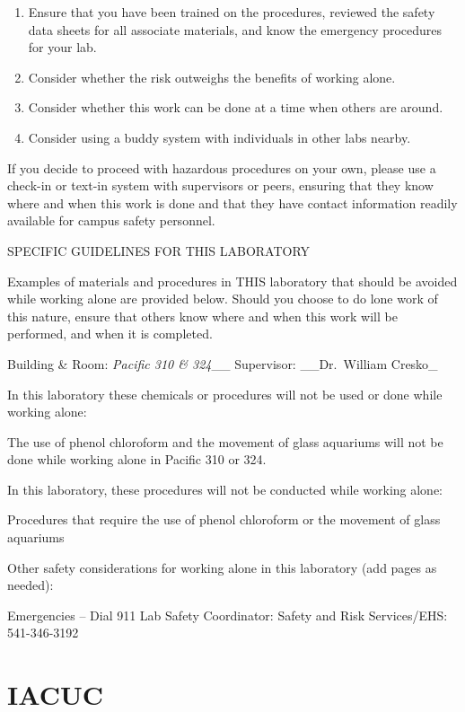 \documentclass[
]{book}
\providecommand{\tightlist}{%
  \setlength{\itemsep}{0pt}\setlength{\parskip}{0pt}}
\begin{document}
\begin{enumerate}
\def\labelenumi{\arabic{enumi}.}
\tightlist
\item
  Ensure that you have been trained on the procedures, reviewed the safety data sheets for all associate materials, and know the emergency procedures for your lab.
\item
  Consider whether the risk outweighs the benefits of working alone.
\item
  Consider whether this work can be done at a time when others are around.
\item
  Consider using a buddy system with individuals in other labs nearby.
\end{enumerate}

If you decide to proceed with hazardous procedures on your own, please use a check-in or text-in system with supervisors or peers, ensuring that they know where and when this work is done and that they have contact information readily available for campus safety personnel.

SPECIFIC GUIDELINES FOR THIS LABORATORY

Examples of materials and procedures in THIS laboratory that should be avoided while working alone are provided below. Should you choose to do lone work of this nature, ensure that others know where and when this work will be performed, and when it is completed.

Building \& Room: \emph{Pacific 310 \& 324}\_\_ Supervisor: \_\_Dr.~William Cresko\_

In this laboratory these chemicals or procedures will not be used or done while working alone:

The use of phenol chloroform and the movement of glass aquariums will not be done while working alone in Pacific 310 or 324.

In this laboratory, these procedures will not be conducted while working alone:

Procedures that require the use of phenol chloroform or the movement of glass aquariums

Other safety considerations for working alone in this laboratory (add pages as needed):

Emergencies -- Dial 911
Lab Safety Coordinator:
Safety and Risk Services/EHS: 541-346-3192

\hypertarget{iacuc}{%
\chapter{IACUC}\label{iacuc}}
\end{document}
